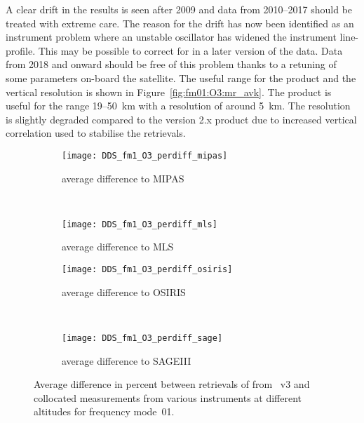 A clear drift in the results is seen after 2009 and data from 2010--2017 should
be treated with extreme care. The reason for the  drift has now been identified
as an instrument problem where an unstable oscillator has widened the
instrument line-profile.  This may be possible to correct for in a later
version of the data.  Data from 2018 and onward should be free of this problem
thanks to a retuning  of some parameters on-board the satellite.  The useful
range for the product and the vertical resolution is shown in
Figure~\ref{fig:fm01:O3:mr_avk}.  The product is useful for the range 19--50~km
with a resolution of around 5~km. The resolution is slightly degraded compared
to the version 2.x product due to increased vertical correlation used to
stabilise the retrievals.


\begin{figure}[tbhp]
    \centering
    \begin{subfigure}[b]{0.49\textwidth}
        \texttt{[image: DDS\_fm1\_O3\_perdiff\_mipas]}
        \caption{average difference to MIPAS}
        \label{fig:fm01:O3:profiles:MIPAS}
    \end{subfigure}
    \,
    \begin{subfigure}[b]{0.49\textwidth}
        \texttt{[image: DDS\_fm1\_O3\_perdiff\_mls]}
        \caption{average difference to MLS}
        \label{fig:fm01:O3:profiles:MLS}
    \end{subfigure}

    \begin{subfigure}[b]{0.49\textwidth}
        \texttt{[image: DDS\_fm1\_O3\_perdiff\_osiris]}
        \caption{average difference to OSIRIS}
        \label{fig:fm01:O3:profiles:OSIRIS}
    \end{subfigure}
    \,
    \begin{subfigure}[b]{0.49\textwidth}
        \texttt{[image: DDS\_fm1\_O3\_perdiff\_sage]}
        \caption{average difference to SAGEIII}
        \label{fig:fm01:O3:profiles:SAGEIII}
    \end{subfigure}
    \caption{Average difference in percent between retrievals of 
    from \smr~v3 and collocated measurements from various instruments at
    different altitudes for frequency mode~01.}
    \label{fig:fm01:O3:profiles}
\end{figure}

